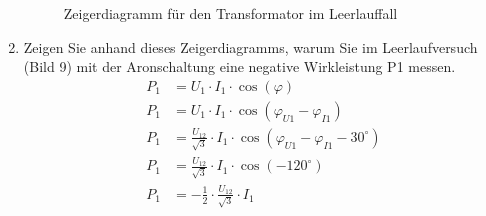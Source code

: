 \begin{enumerate}[label=\alph*)]
\begin{figure}[h!]
\begin{center}
\begin{minipage}[t]{0.45\linewidth}
\begin{center}
					      \caption{Zeigerdiagramm für den Transformator im Leerlauffall}\label{img:2.2.2.2}
				      \end{center}
			      \end{minipage}
		      \end{center}
	      \end{figure}
	\item Zeigen Sie anhand dieses Zeigerdiagramms, warum Sie im Leerlaufversuch (Bild 9)
	      mit der Aronschaltung eine negative Wirkleistung P1 messen.
	      \begin{align*}
		      P_1 & = U_1 \cdot I_1 \cdot \cos(\varphi)                                                    \\
		      P_1 & = U_1 \cdot I_1 \cdot \cos(\varphi_{U1} - \varphi_{I1})                                \\
		      P_1 & = \frac{U_{12}}{\sqrt 3} \cdot I_1 \cdot \cos(\varphi_{U1} - \varphi_{I1} - 30 ^\circ) \\
		      P_1 & = \frac{U_{12}}{\sqrt 3} \cdot I_1 \cdot \cos(-120 ^\circ)                             \\
		      P_1 & = -\frac{1}{2} \cdot \frac{U_{12}}{\sqrt 3} \cdot I_1
	      \end{align*}
\end{enumerate}

